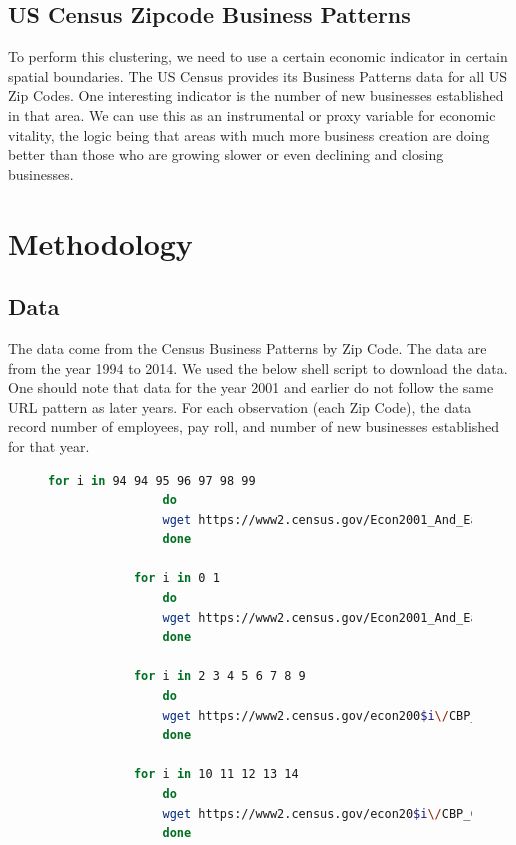 \documentclass[letter, 11pt]{article} %
\begin{document}
	\subsection{US Census Zipcode Business Patterns}
	To perform this clustering, we need to use a certain economic indicator in certain spatial boundaries. The US Census provides its Business Patterns data for all US Zip Codes. One interesting indicator is the number of new businesses established in that area. We can use this as an instrumental or proxy variable for economic vitality, the logic being that areas with much more business creation are doing better than those who are growing slower or even declining and closing businesses. 
	
	\pagebreak
	

\section{Methodology}


	\subsection{Data}
		The data come from the Census Business Patterns by Zip Code. The data are from the year 1994 to 2014. We used the below shell script to download the data. One should note that data for the year 2001 and earlier do not follow the same URL pattern as later years. For each observation (each Zip Code), the data record number of employees, pay roll, and number of new businesses established for that year. 
	
		\begin{figure}[H]
			\centering
			\begin{lstlisting}[language=bash]
			for i in 94 94 95 96 97 98 99
				do
				wget https://www2.census.gov/Econ2001_And_Earlier/CBP_CSV//zbp$i\totals.zip
				done
			
			for i in 0 1
				do
				wget https://www2.census.gov/Econ2001_And_Earlier/CBP_CSV//zbp0$i\totals.zip 
				done
			
			for i in 2 3 4 5 6 7 8 9
				do
				wget https://www2.census.gov/econ200$i\/CBP_CSV/zbp0$i\totals.zip
				done
			
			for i in 10 11 12 13 14
				do
				wget https://www2.census.gov/econ20$i\/CBP_CSV/zbp$i\totals.zip
				done
			\end{lstlisting}
		\end{figure}
	
		\pagebreak
		
\end{document}
